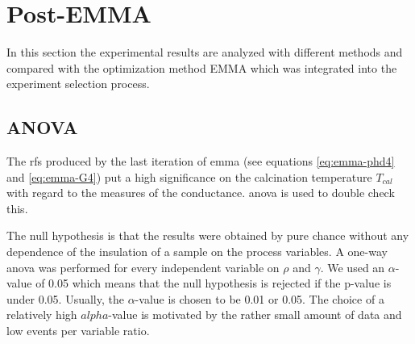 \section{Post-EMMA}
\label{sec:res-post-emma}
In this section the experimental results are analyzed with different methods and compared 
with the optimization method EMMA which was integrated into the experiment selection process. 
\subsection{ANOVA}\label{sec:res-anova}
The \gls{rf}s produced by the last iteration of \gls{emma} (see equations \ref{eq:emma-phd4} and \ref{eq:emma-G4}) put a high significance
on the calcination temperature $T_{cal}$ with regard to the 
measures of the conductance. 
\Gls{anova} is used to double check this. 

The null hypothesis is that the results were obtained by pure chance without any dependence of the insulation of a sample on the process variables.
A one-way \gls{anova} was performed for every independent variable on $\rho$ and $\gamma$. 
We used an $\alpha$-value of 0.05 which means that 
the null hypothesis is rejected if the p-value is under 0.05. 
Usually, the $\alpha$-value is chosen to be 0.01 or 0.05\cite{hoffman2020concept,sellke2001pvalues}.
The choice of a relatively high $alpha$-value is motivated by the rather small amount of data and low events per variable ratio.
%


